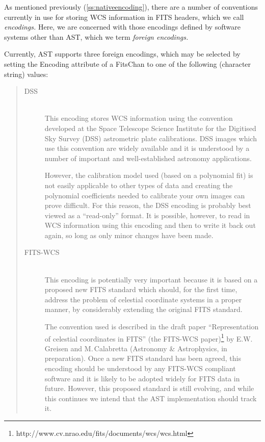 \documentclass[twoside,11pt]{article}
\newcommand{\htmladdnormallinkfoot}[2]{#1\footnote{#2}}
\newcommand{\secref}[1]{\S\ref{#1}}
\renewcommand{\secref}[1]{\ref{#1}}
\begin{document}
As mentioned previously (\secref{ss:nativeencoding}), there are a
number of conventions currently in use for storing WCS information in
FITS headers, which we call {\em{encodings.}} Here, we are concerned
with those encodings defined by software systems other than AST, which
we term {\em{foreign encodings.}}

Currently, AST supports three foreign encodings, which may be selected
by setting the Encoding attribute of a FitsChan to one of the
following (character string) values:

\begin{quote}
\begin{description}
\item[DSS]\mbox{}\\
This encoding stores WCS information using the convention developed at
the Space Telescope Science Institute for the Digitised Sky Survey
(DSS) astrometric plate calibrations.  DSS images which use this
convention are widely available and it is understood by a number of
important and well-established astronomy applications.

However, the calibration model used (based on a polynomial fit) is not
easily applicable to other types of data and creating the polynomial
coefficients needed to calibrate your own images can prove
difficult. For this reason, the DSS encoding is probably best viewed
as a ``read-only'' format. It is possible, however, to read in WCS
information using this encoding and then to write it back out again,
so long as only minor changes have been made.

\item[FITS-WCS]\mbox{}\\
This encoding is potentially very important because it is based on a
proposed new FITS standard which should, for the first time, address
the problem of celestial coordinate systems in a proper manner, by
considerably extending the original FITS standard.

The convention used is described in the draft paper ``Representation
of celestial coordinates in FITS'' \htmladdnormallinkfoot{(the
FITS-WCS paper)}{http://www.cv.nrao.edu/fits/documents/wcs/wcs.html}
by E.W.\,Greisen and M.\,Calabretta (Astronomy \& Astrophysics, in
preparation). Once a new FITS standard has been agreed, this encoding
should be understood by any FITS-WCS compliant software and it is
likely to be adopted widely for FITS data in future.  However, this
proposed standard is still evolving, and while this continues we
intend that the AST implementation should track it.


\end{description}
\end{quote}
\end{document}
